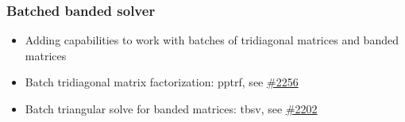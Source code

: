 \begin{frame}
\frametitle{Batched banded solver}
\begin{itemize}
\item Adding capabilities to work with batches of tridiagonal matrices and banded matrices
\item Batch tridiagonal matrix factorization: pptrf, see \href{https://github.com/kokkos/kokkos-kernels/pull/2256}{\#2256}
\item Batch triangular solve for banded matrices: tbsv, see \href{https://github.com/kokkos/kokkos-kernels/pull/2202}{\#2202}
\end{itemize}
\end{frame}


